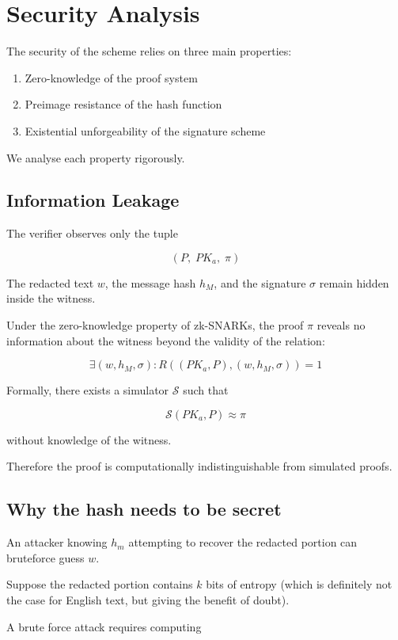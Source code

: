 \documentclass[]{article}
\begin{document}
\section{Security Analysis}

The security of the scheme relies on three main properties:

\begin{enumerate}
	\item Zero-knowledge of the proof system
	\item Preimage resistance of the hash function
	\item Existential unforgeability of the signature scheme
\end{enumerate}

We analyse each property rigorously.

\subsection{Information Leakage}

The verifier observes only the tuple

$$
(P,\;PK_a,\;\pi)
$$

The redacted text $w$, the message hash $h_M$, and the signature $\sigma$ remain hidden inside the witness.

Under the zero-knowledge property of zk-SNARKs, the proof $\pi$ reveals no information about the witness beyond the validity of the relation:

$$
\exists (w,h_M,\sigma) : R((PK_a,P),(w,h_M,\sigma))=1
$$

Formally, there exists a simulator $\mathcal{S}$ such that

$$
\mathcal{S}(PK_a,P) \approx \pi
$$

without knowledge of the witness.

Therefore the proof is computationally indistinguishable from simulated proofs.

\subsection{Why the hash needs to be secret}

An attacker knowing $h_m$ attempting to recover the redacted portion can bruteforce guess $w$.

Suppose the redacted portion contains $k$ bits of entropy (which is definitely not the case for English text, but giving the benefit of doubt).

A brute force attack requires computing
\end{document}
